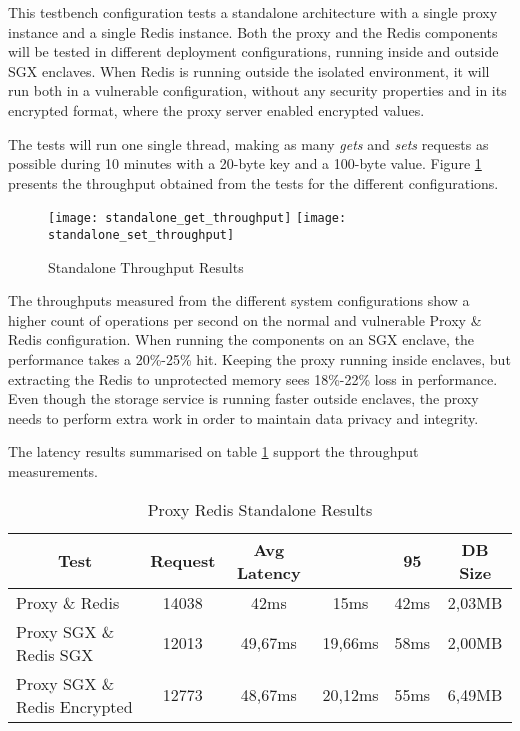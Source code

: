This testbench configuration tests a standalone architecture with a single proxy instance and a single Redis instance. Both the proxy and the Redis components will be tested in different deployment configurations, running inside and outside \gls{SGX} enclaves. When Redis is running outside the isolated environment, it will run both in a vulnerable configuration, without any security properties and in its encrypted format, where the proxy server enabled encrypted values.

The tests will run one single thread, making as many \textit{gets} and \textit{sets} requests as possible during 10 minutes with a 20-byte key and a 100-byte value. Figure \ref{fig:standalone_throughput_results} presents the throughput obtained from the tests for the different configurations.

\begin{figure}[htbp]
  \centering
    {\texttt{[image: standalone\_get\_throughput]}}%
    {\texttt{[image: standalone\_set\_throughput]}}%
  \caption{Standalone Throughput Results}
  \label{fig:standalone_throughput_results}
\end{figure}

The throughputs measured from the different system configurations show a higher count of operations per second on the normal and vulnerable Proxy \& Redis configuration. When running the components on an \gls{SGX} enclave, the performance takes a 20\%-25\% hit. Keeping the proxy running inside enclaves, but extracting the Redis to unprotected memory sees 18\%-22\% loss in performance. Even though the storage service is running faster outside enclaves, the proxy needs to perform extra work in order to maintain data privacy and integrity.
 
The latency results summarised on table \ref{tab:proxy_redis_standalone_latency_results} support the throughput measurements.

\begin{table}[ht]
	\caption{Proxy Redis Standalone Results}
	\label{tab:proxy_redis_standalone_latency_results}
\centering
\begin{tabular}{lccccc}
	\toprule
	\multicolumn{1}{c}{\textbf{Test}} & \pmb{\#}\textbf{Request} & \textbf{Avg Latency} & \pmb{\ensuremath{\sigma}} & \textbf{95}\pmb{\%} & \textbf{DB Size} \\
	\midrule
		Proxy \& Redis & 14038 & 42ms & 15ms & 42ms & 2,03MB 	\\
		Proxy SGX \& Redis SGX & 12013 & 49,67ms & 19,66ms & 58ms & 2,00MB \\
		Proxy SGX \& Redis Encrypted & 12773 & 48,67ms & 20,12ms & 55ms & 6,49MB \\
	\bottomrule
\end{tabular}
\end{table}

